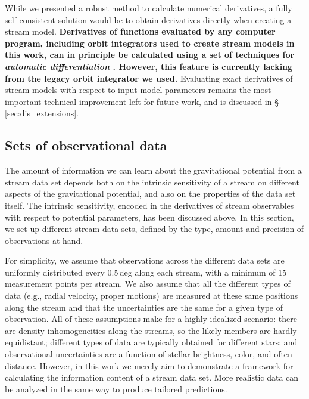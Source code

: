 \documentclass[modern]{aastex62}
\begin{document}
While we presented a robust method to calculate numerical derivatives, a fully self-consistent solution would be to obtain derivatives directly when creating a stream model.
{\bf Derivatives of functions evaluated by any computer program, including orbit integrators used to create stream models in this work, can in principle be calculated using a set of techniques for \emph{automatic differentiation} \citep{griewank2008}.
However, this feature is currently lacking from the legacy orbit integrator we used.}
Evaluating exact derivatives of stream models with respect to input model parameters remains the most important technical improvement left for future work, and is discussed in \S\,\ref{sec:dis_extensions}.


\subsection{Sets of observational data}
\label{sec:datasets}

The amount of information we can learn about the gravitational potential from a stream data set depends both on the intrinsic sensitivity of a stream on different aspects of the gravitational potential, and also on the properties of the data set itself.
The intrinsic sensitivity, encoded in the derivatives of stream observables with respect to potential parameters, has been discussed above.
In this section, we set up different stream data sets, defined by the type, amount and precision of observations at hand.

For simplicity, we assume that observations across the different data sets are uniformly distributed every 0.5\,deg along each stream, with a minimum of 15 measurement points per stream.
We also assume that all the different types of data (e.g., radial velocity, proper motions) are measured at these same positions along the stream and that the uncertainties are the same for a given type of observation.
All of these assumptions make for a highly idealized scenario: there are density inhomogeneities along the streams, so the likely members are hardly equidistant; different types of data are typically obtained for different stars; and observational uncertainties are a function of stellar brightness, color, and often distance.
However, in this work we merely aim to demonstrate a framework for calculating the information content of a stream data set.
More realistic data can be analyzed in the same way to produce tailored predictions.
\end{document}
